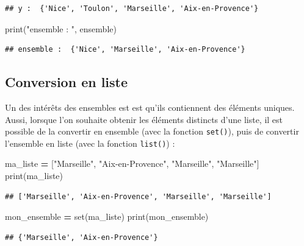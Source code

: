 \documentclass[12pt,]{book}
\newenvironment{Shaded}{\begin{snugshade}}{\end{snugshade}}
\newcommand{\StringTok}[1]{\textcolor[rgb]{0.31,0.60,0.02}{#1}}
\newcommand{\OperatorTok}[1]{\textcolor[rgb]{0.81,0.36,0.00}{\textbf{#1}}}
\newcommand{\BuiltInTok}[1]{#1}
\newcommand{\NormalTok}[1]{#1}
\numberwithin{equation}{section}
\numberwithin{countremarque}{section}
\begin{document}
\begin{lstlisting}
## y :  {'Nice', 'Toulon', 'Marseille', 'Aix-en-Provence'}
\end{lstlisting}

\begin{Shaded}
\begin{Highlighting}[]
\BuiltInTok{print}\NormalTok{(}\StringTok{"ensemble : "}\NormalTok{, ensemble)}
\end{Highlighting}
\end{Shaded}

\begin{lstlisting}
## ensemble :  {'Nice', 'Marseille', 'Aix-en-Provence'}
\end{lstlisting}

\subsection{Conversion en liste}\label{conversion-en-liste}

Un des intérêts des ensembles est est qu'ils contiennent des éléments
uniques. Aussi, lorsque l'on souhaite obtenir les éléments distincts
d'une liste, il est possible de la convertir en ensemble (avec la
fonction \texttt{set()}), puis de convertir l'ensemble en liste (avec la
fonction \texttt{list()}) :

\begin{Shaded}
\begin{Highlighting}[]
\NormalTok{ma_liste }\OperatorTok{=}\NormalTok{ [}\StringTok{"Marseille"}\NormalTok{, }\StringTok{"Aix-en-Provence"}\NormalTok{, }\StringTok{"Marseille"}\NormalTok{, }\StringTok{"Marseille"}\NormalTok{]}
\BuiltInTok{print}\NormalTok{(ma_liste)}
\end{Highlighting}
\end{Shaded}

\begin{lstlisting}
## ['Marseille', 'Aix-en-Provence', 'Marseille', 'Marseille']
\end{lstlisting}

\begin{Shaded}
\begin{Highlighting}[]
\NormalTok{mon_ensemble }\OperatorTok{=} \BuiltInTok{set}\NormalTok{(ma_liste)}
\BuiltInTok{print}\NormalTok{(mon_ensemble)}
\end{Highlighting}
\end{Shaded}

\begin{lstlisting}
## {'Marseille', 'Aix-en-Provence'}
\end{lstlisting}
\end{document}

